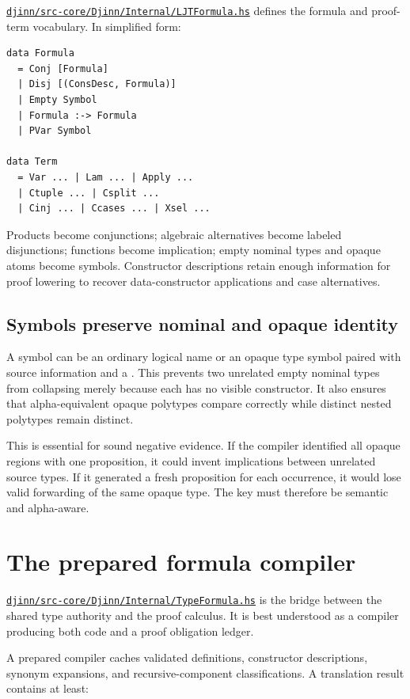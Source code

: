 \documentclass[10pt,letterpaper,oneside]{report}
\newcommand{\code}[1]{\texttt{\detokenize{#1}}}
\def\DjexBase{https://github.com/VladimirReshetnikov/Djex/blob/e454757d53ec057238c22fc6cd0d935b7d96b3dc/}
\newcommand{\dpath}[1]{\href{\DjexBase#1}{\nolinkurl{#1}}}
\begin{document}
\dpath{djinn/src-core/Djinn/Internal/LJTFormula.hs} defines the formula and proof-term vocabulary. In simplified form:

\begin{lstlisting}[language=Haskellish]
data Formula
  = Conj [Formula]
  | Disj [(ConsDesc, Formula)]
  | Empty Symbol
  | Formula :-> Formula
  | PVar Symbol

data Term
  = Var ... | Lam ... | Apply ...
  | Ctuple ... | Csplit ...
  | Cinj ... | Ccases ... | Xsel ...
\end{lstlisting}

Products become conjunctions; algebraic alternatives become labeled disjunctions; functions become implication; empty nominal types and opaque atoms become symbols. Constructor descriptions retain enough information for proof lowering to recover data-constructor applications and case alternatives.

\subsection{Symbols preserve nominal and opaque identity}

A symbol can be an ordinary logical name or an opaque type symbol paired with source information and a \code{TypeAtomKey}. This prevents two unrelated empty nominal types from collapsing merely because each has no visible constructor. It also ensures that alpha-equivalent opaque polytypes compare correctly while distinct nested polytypes remain distinct.

This is essential for sound negative evidence. If the compiler identified all opaque regions with one proposition, it could invent implications between unrelated source types. If it generated a fresh proposition for each occurrence, it would lose valid forwarding of the same opaque type. The key must therefore be semantic and alpha-aware.

\section{The prepared formula compiler}\label{sec:djinn-compiler}

\dpath{djinn/src-core/Djinn/Internal/TypeFormula.hs} is the bridge between the shared type authority and the proof calculus. It is best understood as a compiler producing both code and a proof obligation ledger.

A prepared compiler caches validated definitions, constructor descriptions, synonym expansions, and recursive-component classifications. A translation result contains at least:
\end{document}
